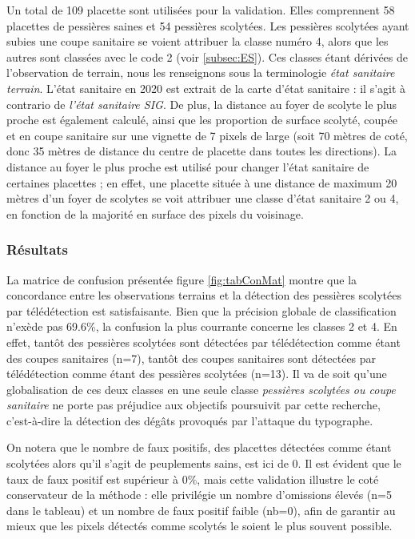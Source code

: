 \documentclass[a4paper, 12pt]{article} %
\begin{document}
Un total de 109 placette sont utilisées pour la validation. Elles comprennent 58 placettes de pessières saines et 54 pessières scolytées. Les pessières scolytées ayant subies une coupe sanitaire se voient attribuer la classe numéro 4, alors que les autres sont classées avec le code 2 (voir \ref{subsec:ES}). Ces classes étant dérivées de l'observation de terrain, nous les renseignons sous la terminologie \textit{état sanitaire terrain}. L'état sanitaire en 2020 est extrait de la carte d'état sanitaire : il s'agit à contrario de \textit{l'état sanitaire SIG}. De plus, la distance au foyer de scolyte le plus proche est également calculé, ainsi que les proportion de surface scolyté, coupée et en coupe sanitaire sur une vignette de 7 pixels de large (soit 70 mètres de coté, donc 35 mètres de distance du centre de placette dans toutes les directions). La distance au foyer le plus proche est utilisé pour changer l'état sanitaire de certaines placettes ; en effet, une placette située à une distance de maximum 20 mètres d'un foyer de scolytes se voit attribuer une classe d'état sanitaire 2 ou 4, en fonction de la majorité en surface des pixels du voisinage.


\subsubsection{Résultats}

La matrice de confusion présentée figure \ref{fig:tabConMat} montre que la concordance entre les observations terrains et la détection des pessières scolytées par télédétection est satisfaisante. Bien que la précision globale de classification n'exède pas 69.6\%, la confusion la plus courrante concerne les classes 2 et 4. En effet, tantôt des pessières scolytées sont détectées par télédétection comme étant des coupes sanitaires (n=7), tantôt des coupes sanitaires sont détectées par télédétection comme étant des pessières scolytées (n=13). Il va de soit qu'une globalisation de ces deux classes en une seule classe \textit{pessières scolytées ou coupe sanitaire} ne porte pas préjudice aux objectifs poursuivit par cette recherche, c'est-à-dire la détection des dégâts provoqués par l'attaque du typographe.

On notera que le nombre de faux positifs, des placettes détectées comme étant scolytées alors qu'il s'agit de peuplements sains, est ici de 0. Il est évident que le taux de faux positif est supérieur à 0\%, mais cette validation illustre le coté conservateur de la méthode : elle privilégie un nombre d'omissions élevés (n=5 dans le tableau) et un nombre de faux positif faible (nb=0), afin de garantir au mieux que les pixels détectés comme scolytés le soient le plus souvent possible.
\end{document}
